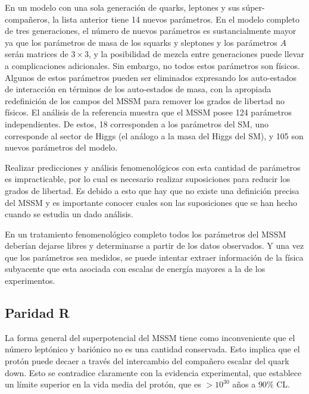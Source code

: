 En un modelo con una sola generación de quarks, leptones y sus
súper-compa\~neros, la lista anterior tiene 14 nuevos parámetros. En el modelo
completo de tres generaciones, el número de nuevos parámetros es sustancialmente
mayor ya que los parámetros de masa de los squarks y sleptones y los parámetros $A$
serán matrices de $3 \times 3$, y la posibilidad de mezcla entre generaciones
puede llevar a complicaciones adicionales. Sin embargo, no todos estos
parámetros son físicos. Algunos de estos parámetros pueden ser eliminados
expresando los auto-estados de interacción en términos de los auto-estados de
masa, con la apropiada redefinición de los campos del MSSM para remover los
grados de libertad no físicos. El análisis de la referencia
\cite{Dimopoulos:1995ju} muestra que el MSSM posee 124 parámetros
independientes. De estos, 18 corresponden a los parámetros del SM, uno
corresponde al sector de Higgs (el análogo a la masa del Higgs del SM), y 105
son nuevos parámetros del modelo.

Realizar predicciones y análisis fenomenológicos con esta cantidad de parámetros es
impracticable, por lo cual es necesario realizar suposiciones para
reducir los grados de libertad. Es debido a esto que hay que no existe una definición
precisa del MSSM y es importante conocer cuales son las suposiciones que se han
hecho cuando se estudia un dado análisis.

En un tratamiento fenomenológico completo todos los parámetros del MSSM deberían
dejarse libres y determinarse a partir de los datos observados. Y una vez que los
parámetros sea medidos, se puede intentar extraer información de la física
subyacente que esta asociada con escalas de energía mayores a la de los
experimentos.



\subsection{Paridad R}

La forma general del superpotencial del MSSM tiene como inconveniente que el
número leptónico y bariónico no es una cantidad conservada. Esto implica que el
protón puede decaer a través del intercambio del compañero escalar del quark
down. Esto se contradice claramente con la evidencia experimental, que establece
un límite superior en la vida media del protón, que es $> 10^{30}$ a\~nos a $90\%$ CL\cite{PDG}.


